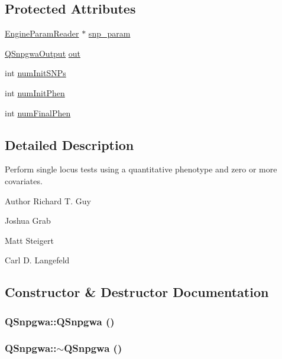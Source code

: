 \subsection*{Protected Attributes}
\begin{DoxyCompactItemize}
\item 
\hyperlink{classEngineParamReader}{EngineParamReader} $\ast$ \hyperlink{classQSnpgwa_a357c8bf58fba34a5076eeb8f61a3cacb}{snp\_\-param}
\item 
\hyperlink{classQSnpgwaOutput}{QSnpgwaOutput} \hyperlink{classQSnpgwa_a0a854b526dee6f1552f280e63068e0a5}{out}
\item 
int \hyperlink{classQSnpgwa_a8134614250816926749e019ab6654344}{numInitSNPs}
\item 
int \hyperlink{classQSnpgwa_a04b7ca3253113ce5e2f5b9e1421161a1}{numInitPhen}
\item 
int \hyperlink{classQSnpgwa_ac7f80fcdcd53d7f8265bdd0591ea5fc9}{numFinalPhen}
\end{DoxyCompactItemize}


\subsection{Detailed Description}
Perform single locus tests using a quantitative phenotype and zero or more covariates.

\begin{DoxyAuthor}{Author}
Richard T. Guy 

Joshua Grab 

Matt Steigert 

Carl D. Langefeld 
\end{DoxyAuthor}


\subsection{Constructor \& Destructor Documentation}
\hypertarget{classQSnpgwa_a348176fb642698c7756df9039b77109f}{
\subsubsection[{QSnpgwa}]{\setlength{\rightskip}{0pt plus 5cm}QSnpgwa::QSnpgwa ()}}
\label{classQSnpgwa_a348176fb642698c7756df9039b77109f}
\hypertarget{classQSnpgwa_a762e315fb2455be5a553083af082b07d}{
\subsubsection[{$\sim$QSnpgwa}]{\setlength{\rightskip}{0pt plus 5cm}QSnpgwa::$\sim$QSnpgwa ()}}
\label{classQSnpgwa_a762e315fb2455be5a553083af082b07d}


